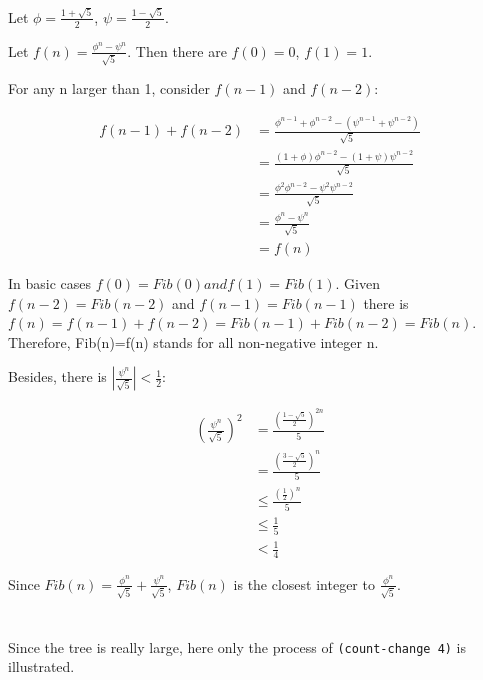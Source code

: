 \documentclass[../main.tex]{subfiles}
\begin{document}

\section{}

Let $\phi = \frac{1 + \sqrt{5}}{2}$, $\psi = \frac{1 - \sqrt{5}}{2}$.

Let $f(n) = \frac{\phi ^ n - \psi ^ n}{\sqrt{5}}$. Then there are $f(0) = 0$, $f(1) = 1$.

For any n larger than 1, consider $f(n - 1)$ and $f(n - 2)$:

\begin{align*}
f(n-1) + f(n-2) &= \frac{\phi^{n-1} + \phi^{n-2}-(\psi^{n-1}+\psi^{n-2})}{\sqrt{5}} \\
                &= \frac{(1+\phi)\phi^{n-2}-(1+\psi)\psi^{n-2}}{\sqrt{5}} \\
                &= \frac{\phi^2\phi^{n-2}-\psi^2\psi^{n-2}}{\sqrt{5}} \\
                &= \frac{\phi^n-\psi^n}{\sqrt{5}} \\
                &= f(n)
\end{align*}

In basic cases $f(0)=Fib(0) and f(1)=Fib(1)$. Given $f(n-2)=Fib(n-2)$ and
 $f(n-1)=Fib(n-1)$ there is
 $f(n)=f(n-1)+f(n-2)=Fib(n-1)+Fib(n-2)=Fib(n)$. Therefore, Fib(n)=f(n)
 stands for all non-negative integer n.

Besides, there is $\left|\frac{\psi^n}{\sqrt{5}}\right|<\frac{1}{2}$:

\begin{align*}
\left({\frac{\psi^n}{\sqrt{5}}}\right)^2 &= \frac{\left({\frac{1-\sqrt{5}}{2}}\right)^{2n}}{5} \\
&= \frac{\left({\frac{3-\sqrt{5}}{2}}\right)^{n}}{5} \\
&\leq \frac{\left(\frac{1}{2}\right)^n}{5} \\
&\leq \frac{1}{5} \\
&< \frac{1}{4}
\end{align*}

Since $Fib(n)=\frac{\phi^n}{\sqrt{5}}+\frac{\psi^n}{\sqrt{5}}$, $Fib(n)$ is the closest
 integer to $\frac{\phi^n}{\sqrt{5}}$.


\section{}

Since the tree is really large, here only the process of \lstinline{(count-change 4)} is illustrated.
\end{document}
